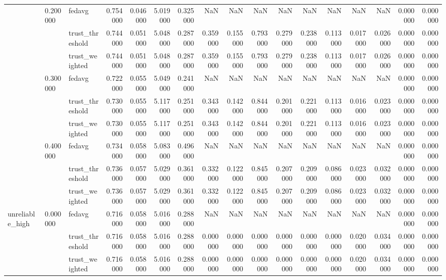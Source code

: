 \begin{tabular}{lllrrrrrrrrrrrrrr}
\cline{2-17}
 & \multirow[t]{3}{*}{0.200000} & fedavg & 0.754000 & 0.046000 & 5.019000 & 0.325000 & NaN & NaN & NaN & NaN & NaN & NaN & NaN & NaN & 0.000000 & 0.000000 \\
 &  & trust_threshold & 0.744000 & 0.051000 & 5.048000 & 0.287000 & 0.359000 & 0.155000 & 0.793000 & 0.279000 & 0.238000 & 0.113000 & 0.017000 & 0.026000 & 0.000000 & 0.000000 \\
 &  & trust_weighted & 0.744000 & 0.051000 & 5.048000 & 0.287000 & 0.359000 & 0.155000 & 0.793000 & 0.279000 & 0.238000 & 0.113000 & 0.017000 & 0.026000 & 0.000000 & 0.000000 \\
\cline{2-17}
 & \multirow[t]{3}{*}{0.300000} & fedavg & 0.722000 & 0.055000 & 5.049000 & 0.241000 & NaN & NaN & NaN & NaN & NaN & NaN & NaN & NaN & 0.000000 & 0.000000 \\
 &  & trust_threshold & 0.730000 & 0.055000 & 5.117000 & 0.251000 & 0.343000 & 0.142000 & 0.844000 & 0.201000 & 0.221000 & 0.113000 & 0.016000 & 0.023000 & 0.000000 & 0.000000 \\
 &  & trust_weighted & 0.730000 & 0.055000 & 5.117000 & 0.251000 & 0.343000 & 0.142000 & 0.844000 & 0.201000 & 0.221000 & 0.113000 & 0.016000 & 0.023000 & 0.000000 & 0.000000 \\
\cline{2-17}
 & \multirow[t]{3}{*}{0.400000} & fedavg & 0.734000 & 0.058000 & 5.083000 & 0.496000 & NaN & NaN & NaN & NaN & NaN & NaN & NaN & NaN & 0.000000 & 0.000000 \\
 &  & trust_threshold & 0.736000 & 0.057000 & 5.029000 & 0.361000 & 0.332000 & 0.122000 & 0.845000 & 0.207000 & 0.209000 & 0.086000 & 0.023000 & 0.032000 & 0.000000 & 0.000000 \\
 &  & trust_weighted & 0.736000 & 0.057000 & 5.029000 & 0.361000 & 0.332000 & 0.122000 & 0.845000 & 0.207000 & 0.209000 & 0.086000 & 0.023000 & 0.032000 & 0.000000 & 0.000000 \\
\cline{1-17} \cline{2-17}
\multirow[t]{3}{*}{unreliable_high} & \multirow[t]{3}{*}{0.000000} & fedavg & 0.716000 & 0.058000 & 5.016000 & 0.288000 & NaN & NaN & NaN & NaN & NaN & NaN & NaN & NaN & 0.000000 & 0.000000 \\
 &  & trust_threshold & 0.716000 & 0.058000 & 5.016000 & 0.288000 & 0.000000 & 0.000000 & 0.000000 & 0.000000 & 0.000000 & 0.000000 & 0.020000 & 0.034000 & 0.000000 & 0.000000 \\
 &  & trust_weighted & 0.716000 & 0.058000 & 5.016000 & 0.288000 & 0.000000 & 0.000000 & 0.000000 & 0.000000 & 0.000000 & 0.000000 & 0.020000 & 0.034000 & 0.000000 & 0.000000 \\

\end{tabular}
